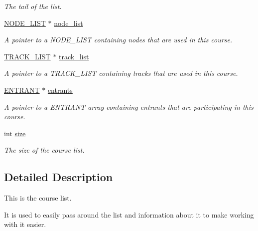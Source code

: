 \begin{DoxyCompactItemize}
\begin{DoxyCompactList}\small\item\em The tail of the list. \end{DoxyCompactList}\item 
\hyperlink{node_8h_a12b8a06e01ee52ed252bc1b6179a8b0d}{N\-O\-D\-E\-\_\-\-L\-I\-S\-T} $\ast$ \hyperlink{structcourse__list_a5adfcd18fff8020d1e4c068082a03cba}{node\-\_\-list}
\begin{DoxyCompactList}\small\item\em A pointer to a N\-O\-D\-E\-\_\-\-L\-I\-S\-T containing nodes that are used in this course. \end{DoxyCompactList}\item 
\hyperlink{track_8h_a74548625073be9665a690d126e4daf4f}{T\-R\-A\-C\-K\-\_\-\-L\-I\-S\-T} $\ast$ \hyperlink{structcourse__list_aaad25fce52f3485b94f900248f4fb45b}{track\-\_\-list}
\begin{DoxyCompactList}\small\item\em A pointer to a T\-R\-A\-C\-K\-\_\-\-L\-I\-S\-T containing tracks that are used in this course. \end{DoxyCompactList}\item 
\hyperlink{entrant_8h_a0e99575e41c762d6089bed6332ce69b3}{E\-N\-T\-R\-A\-N\-T} $\ast$ \hyperlink{structcourse__list_a4e1346092023718442c7b74cd5b30fa4}{entrants}
\begin{DoxyCompactList}\small\item\em A pointer to a E\-N\-T\-R\-A\-N\-T array containing entrants that are participating in this course. \end{DoxyCompactList}\item 
\hypertarget{structcourse__list_adf389e68a2d5fb4d4fabea907e1da1fc}{int \hyperlink{structcourse__list_adf389e68a2d5fb4d4fabea907e1da1fc}{size}}\label{structcourse__list_adf389e68a2d5fb4d4fabea907e1da1fc}

\begin{DoxyCompactList}\small\item\em The size of the course list. \end{DoxyCompactList}\end{DoxyCompactItemize}



\subsection{Detailed Description}
This is the course list. 

It is used to easily pass around the list and information about it to make working with it easier. 

